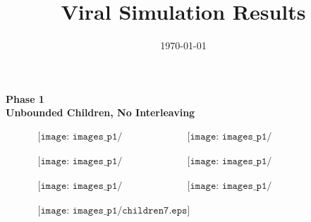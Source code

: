 \documentclass[a4paper,10pt]{article}
\title{Viral Simulation Results}
\author{}
\date{\today}
\begin{document}
\maketitle

\begin{center}
\huge{\textbf{Phase 1}} \\ 
\LARGE{\textbf{Unbounded Children, No Interleaving}}
\end{center}

\begin{figure}[h]
\begin{center}$
\begin{array}{cc}
\texttt{[image: images\_p1/children1.eps]} &
\texttt{[image: images\_p1/children2.eps]}
\end{array}$
\end{center}
\end{figure}

\begin{figure}[h]
\begin{center}$
\begin{array}{cc}
\texttt{[image: images\_p1/children3.eps]} &
\texttt{[image: images\_p1/children4.eps]}
\end{array}$
\end{center}
\end{figure}

\begin{figure}[h]
\begin{center}$
\begin{array}{cc}
\texttt{[image: images\_p1/children5.eps]} &
\texttt{[image: images\_p1/children6.eps]}
\end{array}$
\end{center}
\end{figure}

\begin{figure}[h]
\begin{center}$
\begin{array}{cc}
\texttt{[image: images\_p1/children7.eps]} 
\end{array}$
\end{center}
\end{figure}

\end{document}
